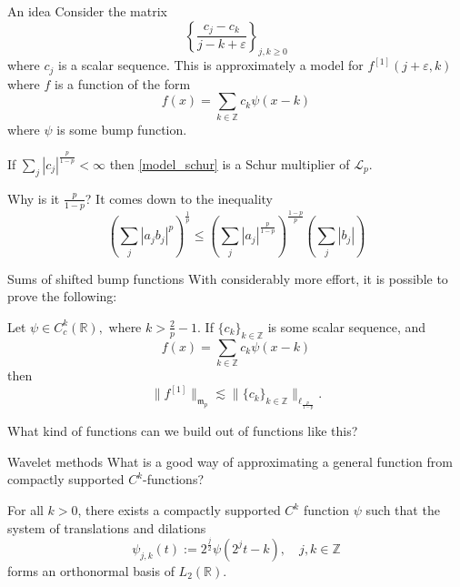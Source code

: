 \documentclass{beamer}
\numberwithin{equation}{section}
\theoremstyle{plain}
\theoremstyle{plain}
\theoremstyle{definition}
\theoremstyle{plain}
\theoremstyle{plain}
\theoremstyle{definition}
\newcommand{\Rl}{\mathbb{R}}
\newcommand{\Itgr}{\mathbb{Z}}
\newcommand{\Lc}{\mathcal{L}}
\newcommand{\mf}{\mathfrak{m}}
\begin{document}
\begin{frame}{An idea}
    Consider the matrix
    \begin{equation}\label{model_schur}
        \left\{\frac{c_j-c_k}{j-k+\varepsilon}\right\}_{j,k\geq 0}
    \end{equation}
    where $c_j$ is a scalar sequence. This is approximately a model for $f^{[1]}(j+\varepsilon,k)$ where $f$ is a function of the form
    \[
        f(x) = \sum_{k\in \Itgr} c_k\psi(x-k)
    \]
    where $\psi$ is some bump function.
    \begin{lemma}
        If $\sum_{j} |c_j|^{\frac{p}{1-p}}<\infty$ then \eqref{model_schur} is a Schur multiplier of $\Lc_p.$
    \end{lemma}
    \pause
    Why is it $\frac{p}{1-p}$? It comes down to the inequality
    \[
        (\sum_{j} |a_jb_j|^p)^{\frac1p} \leq (\sum_{j} |a_j|^{\frac{p}{1-p}})^{\frac{1-p}{p}}(\sum_{j} |b_j|)
    \]
\end{frame}

\begin{frame}{Sums of shifted bump functions}
    With considerably more effort, it is possible to prove the following:
    \begin{theorem}
        Let $\psi \in C^k_c(\Rl),$ where $k>\frac{2}{p}-1.$ If $\{c_k\}_{k\in \Itgr}$ is some scalar sequence, and
        \[
            f(x) = \sum_{k\in \Itgr} c_k\psi(x-k)
        \]
        then
        \[
            \|f^{[1]}\|_{\mf_p} \lesssim \|\{c_k\}_{k\in \Itgr}\|_{\ell_{\frac{p}{1-p}}}.
        \]
    \end{theorem}
    What kind of functions can we build out of functions like this?
\end{frame}

\begin{frame}{Wavelet methods}
    What is a good way of approximating a general function from compactly supported $C^k$-functions?\pause
    \begin{theorem}[Daubechies (1988)]
        For all $k>0$, there exists a compactly supported $C^k$ function $\psi$ such that the system of translations
        and dilations
        \begin{equation*}
            \psi_{j,k}(t) := 2^{\frac{j}{2}}\psi(2^jt-k),\quad j,k\in \Itgr
        \end{equation*}
        forms an orthonormal basis of $L_2(\Rl).$
    \end{theorem}
\end{frame}
\end{document}
